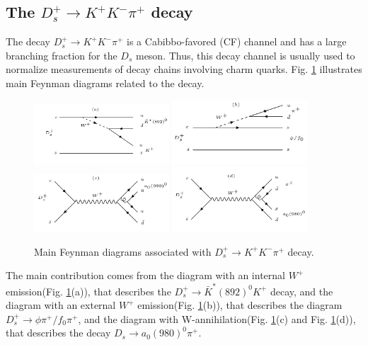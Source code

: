 \subsection{The $D_{s}^{+} \rightarrow K^{+}K^{-}\pi^{+}$ decay}
\par{

    The decay $D_{s}^{+} \rightarrow K^{+}K^{-}\pi^{+}$ is a Cabibbo-favored (CF) channel and has a large branching fraction for the $D_{s}$ meson.
    Thus, this decay channel is usually used to normalize measurements of decay chains involving charm quarks.
    Fig. \ref{Feynman-dia} illustrates main Feynman diagrams related to the decay.
    \begin{figure}[h]
        \centering
        \includegraphics[width=0.45\textwidth]{plot/Fa.PNG}
        \includegraphics[width=0.45\textwidth]{plot/Fb.PNG}
        \includegraphics[width=0.45\textwidth]{plot/Fc.PNG}
        \includegraphics[width=0.45\textwidth]{plot/Fd.PNG}
        \caption{Main Feynman diagrams associated with $D_{s}^{+} \rightarrow K^{+}K^{-}\pi^{+}$ decay.}
        \label{Feynman-dia}
    \end{figure}
    The main contribution comes from the diagram with an internal $W^{+}$ emission(Fig. \ref{Feynman-dia}(a)), that describes the $D_{s}^{+} \rightarrow \bar{K}^{*}(892)^{0}K^{+}$ decay, 
    and the diagram with an external $W^{+}$ emission(Fig. \ref{Feynman-dia}(b)), that describes the diagram $D_{s}^{+} \rightarrow \phi\pi^{+}/ f_{0}\pi^{+}$, 
    and the diagram with W-annihilation(Fig. \ref{Feynman-dia}(c) and Fig. \ref{Feynman-dia}(d)), that describes the decay $D_{s} \rightarrow a_{0}(980)^{0}\pi^{+}$.
}
    
